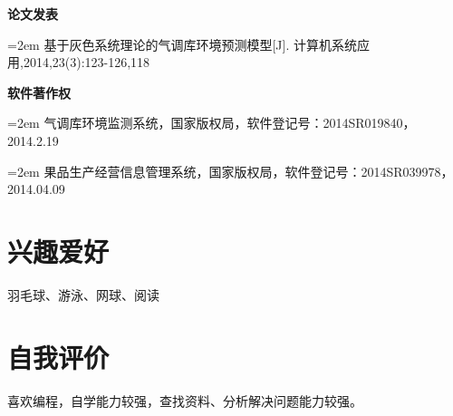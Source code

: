 \documentclass[paper=a4,fontsize=11pt]{scrartcl} %
\newcommand{\sepspace}{\vspace*{1em}}		%
\newcommand{\Section}[1]{\section*{ #1 }}          %
\newcommand{\Academic}[2]{
		\noindent \textbf{#1} \par      %
		\hangindent=2em \small #2 %
		\normalsize \par}
\begin{document}
\begin{CJK}{UTF8}{gbsn}
\Academic{论文发表}{基于灰色系统理论的气调库环境预测模型[J]. 计算机系统应用,2014,23(3):123-126,118}
\sepspace

\Academic{软件著作权}{气调库环境监测系统，国家版权局，软件登记号：2014SR019840，2014.2.19}
\Academic{}{果品生产经营信息管理系统，国家版权局，软件登记号：2014SR039978，2014.04.09}
\sepspace

\Section{兴趣爱好}
羽毛球、游泳、网球、阅读

\Section{自我评价}
喜欢编程，自学能力较强，查找资料、分析解决问题能力较强。
\end{CJK}     %
\end{document}
